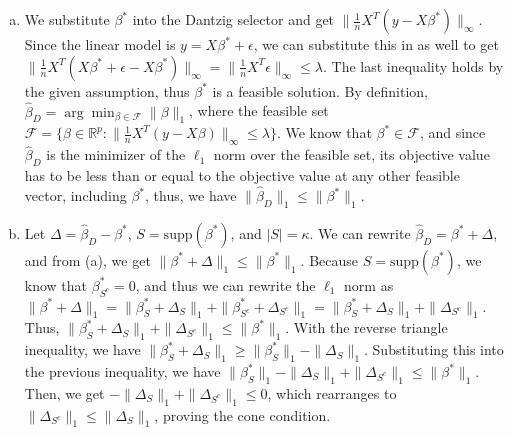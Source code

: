 \documentclass[11pt,a4paper,margin=1in]{article}
\begin{document}
\section{}
\begin{enumerate}[(a)]
    \item We substitute $\beta^*$ into the Dantzig selector and get $\|\frac{1}{n}X^T(y - X\beta^*)\|_\infty$.
    Since the linear model is $y = X\beta^* + \epsilon$, we can substitute this in
    as well to get $\|\frac{1}{n}X^T(X\beta^* + \epsilon - X\beta^*)\|_\infty = \|\frac{1}{n}X^T\epsilon\|_\infty \leq \lambda$.
    The last inequality holds by the given assumption, thus $\beta^*$ is a feasible solution.
    By definition, $\hat{\beta}_D = \arg\min_{\beta \in \mathcal{F}}\|\beta\|_1$, 
    where the feasible set $\mathcal{F} = \{\beta \in \mathbb{R}^p: \|\frac{1}{n}X^T(y - X\beta)\|_\infty \leq \lambda\}$.
    We know that $\beta^* \in \mathcal{F}$, and since $\hat{\beta}_D$ is the 
    minimizer of the $\ell_1$ norm over the feasible set, its objective value has
    to be less than or equal to the objective value at any other feasible vector,
    including $\beta^*$, thus, we have $\|\hat{\beta}_D\|_1 \leq \|\beta^*\|_1$.
    \item Let $\Delta = \hat{\beta}_D - \beta^*$, $S = \text{supp}(\beta^*)$, and 
    $|S| = \kappa$. We can rewrite $\hat{\beta}_D = \beta^* + \Delta$, and from
    (a), we get $\|\beta^* + \Delta\|_1 \leq \|\beta^*\|_1$. Because $S = \text{supp}(\beta^*)$, 
    we know that $\beta^*_{S^c} = 0$, and thus we can rewrite the $\ell_1$ norm as
    $\|\beta^* + \Delta\|_1 = \|\beta^*_S + \Delta_S\|_1 + \|\beta^*_{S^c} + \Delta_{S^c}\|_1 = \|\beta^*_S + \Delta_S\|_1 + \|\Delta_{S^c}\|_1$. 
    Thus, $\|\beta^*_S + \Delta_S\|_1 + \|\Delta_{S^c}\|_1 \leq \|\beta^*\|_1$.
    With the reverse triangle inequality, we have $\|\beta^*_S + \Delta_S\|_1 \geq \|\beta^*_S\|_1 - \|\Delta_S\|_1$.
    Substituting this into the previous inequality, we have $\|\beta^*_S\|_1 - \|\Delta_S\|_1 + \|\Delta_{S^c}\|_1 \leq \|\beta^*\|_1$.
    Then, we get $-\|\Delta_S\|_1 + \|\Delta_{S^c}\|_1 \leq 0$, which rearranges to 
    $\|\Delta_{S^c}\|_1 \leq \|\Delta_S\|_1$, proving the cone condition.


\end{enumerate}
\end{document}
